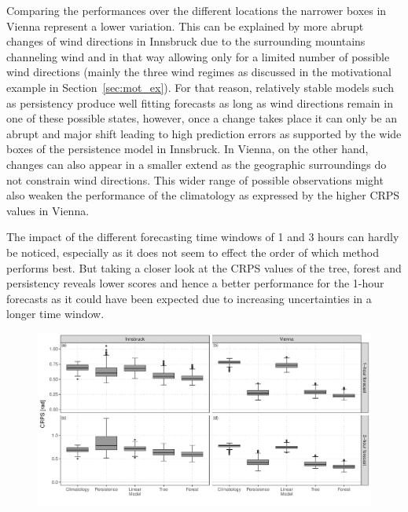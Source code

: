 \documentclass[nojss]{jss}
\numberwithin{equation}{section}
\begin{document}
Comparing the performances over the different locations the narrower boxes in Vienna represent
a lower variation. This can be explained by more abrupt changes of wind directions in Innsbruck
due to the surrounding mountains channeling wind and in that way allowing only for a limited
number of possible wind directions (mainly the three wind regimes as discussed in the motivational
example in Section~\ref{sec:mot_ex}). For that reason, relatively stable models such as persistency
produce well fitting forecasts as long as wind directions remain in one of these possible states,
however, once a change takes place it can only be an abrupt and major shift leading to high
prediction errors as supported by the wide boxes of the persistence model in Innsbruck. In Vienna,
on the other hand, changes can also appear in a smaller extend as the geographic surroundings do not
constrain wind directions. This wider range of possible observations might also weaken the performance
of the climatology as expressed by the higher CRPS values in Vienna.

The impact of the different forecasting time windows of 1 and 3 hours can hardly be noticed, especially
as it does not seem to effect the order of which method performs best. But taking a closer look
at the CRPS values of the tree, forest and persistency reveals lower scores and hence a better 
performance for the 1-hour forecasts as it could have been expected due to increasing uncertainties
in a longer time window.

\begin{figure}[t]
\centering
{}
\includegraphics{_plot_circforest_validation_crpsraw_agg_comparison_with_lowff_v14b.pdf}
\caption{}
\label{fig:boxplot_crpsraw} 
\end{figure}
\end{document}
